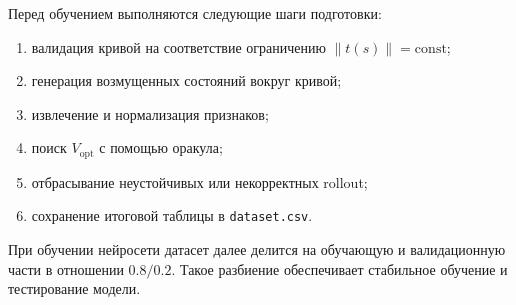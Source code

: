 Перед обучением выполняются следующие шаги подготовки:
\begin{enumerate}
    \item валидация кривой на соответствие ограничению $\|t(s)\|=\mathrm{const}$;
    \item генерация возмущенных состояний вокруг кривой;
    \item извлечение и нормализация признаков;
    \item поиск $V_{\mathrm{opt}}$ с помощью оракула;
    \item отбрасывание неустойчивых или некорректных rollout;
    \item сохранение итоговой таблицы в \texttt{dataset.csv}.
\end{enumerate}

При обучении нейросети датасет далее делится на обучающую и валидационную части в отношении $0.8/0.2$.
Такое разбиение обеспечивает стабильное обучение и тестирование модели.
